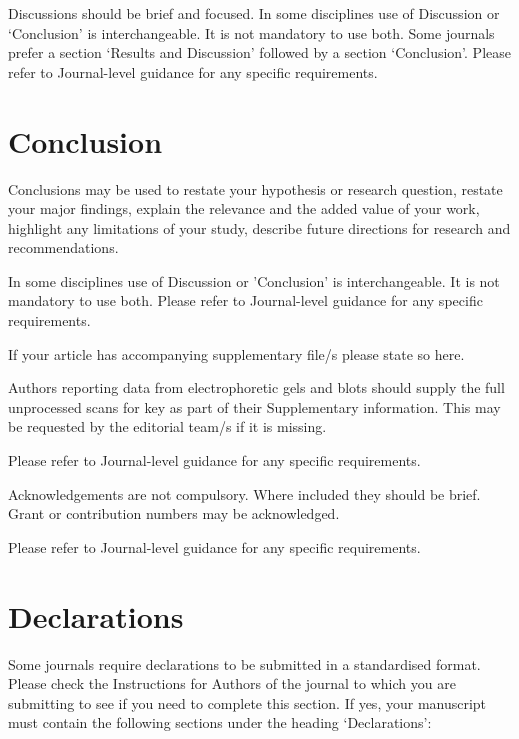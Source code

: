 \documentclass[pdflatex,sn-mathphys-num]{sn-jnl}%
\theoremstyle{thmstyleone}%
\theoremstyle{thmstyletwo}%
\theoremstyle{thmstylethree}%
\begin{document}
Discussions should be brief and focused. In some disciplines use of Discussion or `Conclusion' is interchangeable. It is not mandatory to use both. Some journals prefer a section `Results and Discussion' followed by a section `Conclusion'. Please refer to Journal-level guidance for any specific requirements. 

\section{Conclusion}\label{sec13}

Conclusions may be used to restate your hypothesis or research question, restate your major findings, explain the relevance and the added value of your work, highlight any limitations of your study, describe future directions for research and recommendations. 

In some disciplines use of Discussion or 'Conclusion' is interchangeable. It is not mandatory to use both. Please refer to Journal-level guidance for any specific requirements. 

\backmatter


If your article has accompanying supplementary file/s please state so here. 

Authors reporting data from electrophoretic gels and blots should supply the full unprocessed scans for key as part of their Supplementary information. This may be requested by the editorial team/s if it is missing.

Please refer to Journal-level guidance for any specific requirements.


Acknowledgements are not compulsory. Where included they should be brief. Grant or contribution numbers may be acknowledged.

Please refer to Journal-level guidance for any specific requirements.

\section*{Declarations}

Some journals require declarations to be submitted in a standardised format. Please check the Instructions for Authors of the journal to which you are submitting to see if you need to complete this section. If yes, your manuscript must contain the following sections under the heading `Declarations':
\end{document}
